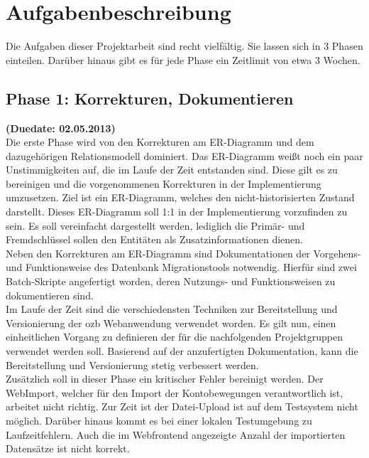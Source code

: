 \documentclass[12pt,             %
               a4paper,          %
               listof=totoc,     %
               index=totoc,      %
               bibliography=totoc,%
               oneside,         %
               BCOR1cm,          %
               english   %
               ]{scrbook}
\begin{document}
\section{Aufgabenbeschreibung}
Die Aufgaben dieser Projektarbeit sind recht vielfältig. Sie lassen sich in 3 Phasen einteilen. Darüber hinaus gibt es für jede Phase ein Zeitlimit von etwa 3 Wochen.

\subsection{Phase 1: Korrekturen, Dokumentieren}
\textbf {(Duedate: 02.05.2013)}\\
Die erste Phase wird von den Korrekturen am ER-Diagramm und dem dazugehörigen Relationsmodell dominiert. Das ER-Diagramm weißt noch ein paar Unstimmigkeiten auf, die im Laufe der Zeit entstanden sind. Diese gilt es zu bereinigen und die vorgenommenen Korrekturen in der Implementierung umzusetzen. Ziel ist ein ER-Diagramm, welches den nicht-historisierten Zustand darstellt. Dieses ER-Diagramm soll 1:1 in der Implementierung vorzufinden zu sein. Es soll vereinfacht dargestellt werden, lediglich die Primär- und Fremdschlüssel sollen den Entitäten als Zusatzinformationen dienen.\\

Neben den Korrekturen am ER-Diagramm sind Dokumentationen der Vorgehens- und Funktionsweise des Datenbank Migrationstools notwendig. Hierfür sind zwei Batch-Skripte angefertigt worden, deren Nutzungs- und Funktionsweisen zu dokumentieren sind.\\

Im Laufe der Zeit sind die verschiedensten Techniken zur Bereitstellung und Versionierung der ozb Webanwendung verwendet worden. Es gilt nun, einen einheitlichen Vorgang zu definieren der für die nachfolgenden Projektgruppen verwendet werden soll. Basierend auf der anzufertigten Dokumentation, kann die Bereitstellung und Versionierung stetig verbessert werden.\\

Zusätzlich soll in dieser Phase ein kritischer Fehler bereinigt werden. Der WebImport, welcher für den Import der Kontobewegungen verantwortlich ist, arbeitet nicht richtig. Zur Zeit ist der Datei-Upload ist auf dem Testsystem nicht möglich. Darüber hinaus kommt es bei einer lokalen Testumgebung zu Laufzeitfehlern. Auch die im Webfrontend angezeigte Anzahl der importierten Datensätze ist nicht korrekt.
\end{document}
